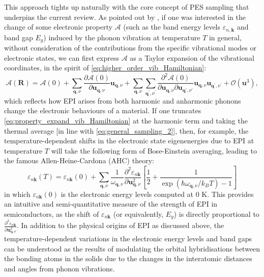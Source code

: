 This approach tights up naturally with the core concept of PES sampling that underpins the current review. As pointed out by \citet{monserrat2018electron}, if one was interested in the change of some electronic property $\mathcal{A}$ (such as the band energy levels $\varepsilon_{n,\bm{k}}$ and band gap $E_g$) induced by the phonon vibration at temperature $T$ in general, without  consideration of the contributions from the specific vibrational modes or electronic states, we can first express $\mathcal{A}$ as a Taylor expansion of the vibrational coordinates, in the spirit of \cref{eq:higher_order_vib_Hamiltonian}:
\begin{equation}
    \label{eq:property_expand_vib_Hamiltonian}
    \mathcal{A}(\bm{R})=\mathcal{A}(0)+\sum_{\bm{q},\nu}\frac{\partial \mathcal{A}(0)}{\partial\bm{u}_{\bm{q},\nu}}\bm{u}_{\bm{q},\nu}+\sum_{\bm{q},\nu}\sum_{\bm{q}^\prime,\nu^\prime}\frac{\partial^2\mathcal{A}(0)}{\partial\bm{u}_{\bm{q},\nu}\partial\bm{u}_{\bm{q}^\prime,\nu^\prime}}\bm{u}_{\bm{q},\nu}\bm{u}_{\bm{q}^\prime,\nu^\prime}+\mathcal{O}(\bm{u}^3),
\end{equation}
which reflects how EPI arises from both harmonic and anharmonic phonons change the electronic behaviours of a material. If one truncates \cref{eq:property_expand_vib_Hamiltonian} at the harmonic term and taking the thermal average [in line with \cref{eq:general_sampling_2}], then, for example, the temperature-dependent shifts in the electronic state eigenenergies due to EPI at temperature $T$ will take the following form of Bose-Einstein averaging, leading to the famous Allen-Heine-Cardona (AHC) theory:\cite{allen1976theory,allen1981theory}
\begin{equation}
    \label{eq:electronic_state_epi_thermal_av}
    \varepsilon_{n\bm{k}}(T)=\varepsilon_{n\bm{k}}(0)+\sum_{\bm{q},\nu}\frac{1}{\omega_{\bm{q},\nu}}\frac{\partial^2 \varepsilon_{n\bm{k}}}{\partial \bm{u}^2_{\bm{q},\nu}}\left[\frac{1}{2}+\frac{1}{\exp(\hbar\omega_{\bm{q},\nu}/k_B T)-1} \right]
\end{equation}
in which $\varepsilon_{n\bm{k}}(0)$ is the electronic energy levels computed at 0 K. This provides an intuitive and semi-quantitative measure of the strength of EPI in semiconductors, as the shift of $\varepsilon_{n\bm{k}}$ (or equivalently, $E_g$) is directly proportional to $\frac{\partial^2 \varepsilon_{n\bm{k}}}{\partial \bm{u}^2_{\bm{q},\nu}}$. In addition to the physical origins of EPI as discussed above, the temperature-dependent variations in the electronic energy levels and band gaps can be understood as the results of modulating the orbital hybridisations between the bonding atoms in the solids due to the changes in the interatomic distances and angles from phonon vibrations. 

